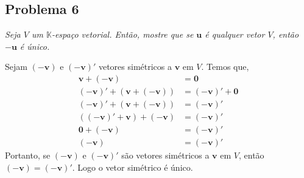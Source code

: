 \subsection*{Problema 6}

\textit{Seja  $V$ um  $\mathbb{K}$-espaço  vetorial.  Então,  mostre que  se
  $\bm{u}$ é qualquer vetor $V$, então $-\bm{u}$ é único.}

Sejam $(-\bm{v})$ e $(-\bm{v})'$ vetores simétricos a $\bm{v}$ em $V$. Temos que,
\begin{align*}
    \bm{v} + (-\bm{v}) &= \bm{0} \tag{EV-A4} \\
    (-\bm{v})' + (\bm{v} + (-\bm{v})) &= (-\bm{v})' + \bm{0} \\
    (-\bm{v})' + (\bm{v} + (-\bm{v})) &= (-\bm{v})' \tag{EV-A3} \\
    ((-\bm{v})' + \bm{v}) + (-\bm{v}) &= (-\bm{v})' \tag{EV-A2} \\
    \bm{0} + (-\bm{v}) &= (-\bm{v})' \tag{EV-A4} \\
    (-\bm{v}) &= (-\bm{v})' \tag{EV-A3} 
\end{align*}
Portanto, se $(-\bm{v})$ e $(-\bm{v})'$ são vetores simétricos a $\bm{v}$ em $V$, então $(-\bm{v}) = (-\bm{v})'$. Logo o vetor simétrico é único.
